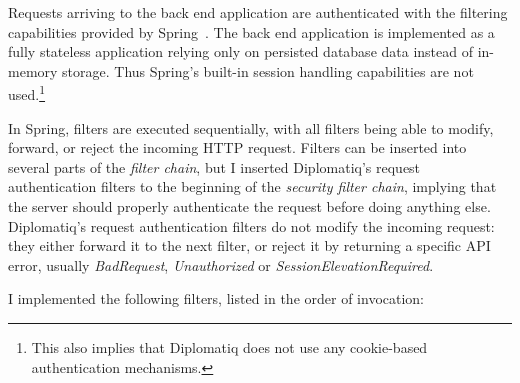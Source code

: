 Requests arriving to the back end application are authenticated with the filtering capabilities provided by Spring~\cite{spring-boot-reference-docs}. The back end application is implemented as a fully stateless application relying only on persisted database data instead of in-memory storage. Thus Spring's built-in session handling capabilities are not used.\footnote{This also implies that Diplomatiq does not use any cookie-based authentication mechanisms.}

In Spring, filters are executed sequentially, with all filters being able to modify, forward, or reject the incoming HTTP request. Filters can be inserted into several parts of the \emph{filter chain}, but I inserted Diplomatiq's request authentication filters to the beginning of the \emph{security filter chain}, implying that the server should properly authenticate the request before doing anything else. Diplomatiq's request authentication filters do not modify the incoming request: they either forward it to the next filter, or reject it by returning a specific API error, usually \emph{BadRequest}, \emph{Unauthorized} or \emph{SessionElevationRequired}.

I implemented the following filters, listed in the order of invocation:

